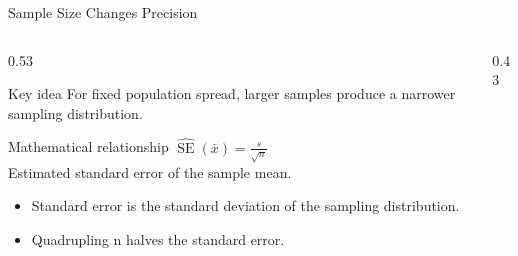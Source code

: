 \documentclass[aspectratio=169]{beamer}
\begin{document}
\begin{frame}{Sample Size Changes Precision}
\begin{columns}[T]
\begin{column}{0.53\textwidth}
\begin{alertblock}{Key idea}
\small For fixed population spread, larger samples produce a narrower sampling distribution.
\end{alertblock}

\begin{block}{Mathematical relationship}
\centering\Large $\widehat{\operatorname{SE}}(\bar{x})=\frac{s}{\sqrt{n}}$\\[0.12cm]
\small Estimated standard error of the sample mean.
\end{block}

\begin{itemize}
\small
\item Standard error is the standard deviation of the sampling distribution.
\item Quadrupling n halves the standard error.
\end{itemize}
\end{column}
\begin{column}{0.43\textwidth}
\begin{center}\end{center}
\end{column}
\end{columns}

\end{frame}
\end{document}
